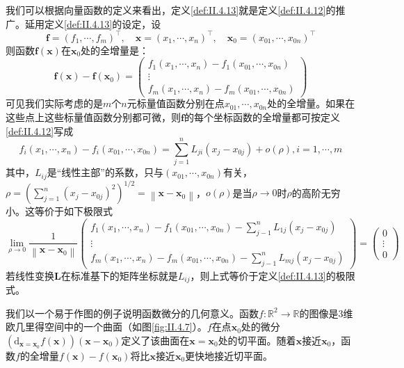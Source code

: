 \documentclass[../main.tex]{subfiles}
\begin{document}
我们可以根据向量函数的定义来看出，定义\ref{def:II.4.13}就是定义\ref{def:II.4.12}的推广。延用定义\ref{def:II.4.13}的设定，设
\[\mathbf{f}=\left(f_1,\cdots,f_m\right)^\intercal,\quad\mathbf{x}=\left(x_1,\cdots,x_n\right)^\intercal,\quad\mathbf{x}_0=\left(x_{01},\cdots,x_{0n}\right)^\intercal\]
则函数$\mathbf{f}\left(\mathbf{x}\right)$在$\mathbf{x}_0$处的全增量是：
\[
    \mathbf{f}\left(\mathbf{x}\right)-\mathbf{f}\left(\mathbf{x}_0\right)=\left(
    \begin{array}{c}
            f_1\left(x_1,\cdots,x_n\right)-f_1\left(x_{01},\cdots,x_{0n}\right) \\
            \vdots                                                              \\
            f_m\left(x_1,\cdots,x_n\right)-f_m\left(x_{01},\cdots,x_{0n}\right)
        \end{array}\right)
\]
可见我们实际考虑的是$m$个$n$元标量值函数分别在点$x_{01},\cdots,x_{0n}$处的全增量。如果在这些点上这些标量值函数分别都可微，则$\mathbf{f}$的每个坐标函数的全增量都可按定义\ref{def:II.4.12}写成
\[
    f_i\left(x_1,\cdots,x_n\right)-f_i\left(x_{01},\cdots,x_{0n}\right)=\sum_{j=1}^n L_{ji}\left(x_j-x_{0j}\right)+o\left(\rho\right),i=1,\cdots,m
\]
其中，$L_{ij}$是“线性主部”的系数，只与$\left(x_{01},\cdots,x_{0n}\right)$有关，$\rho=\left(\sum_{j=1}^n\left(x_j-x_{0j}\right)^2\right)^{1/2}=\left\|\mathbf{x}-\mathbf{x}_0\right\|$，$o\left(\rho\right)$是当$\rho\to 0$时$\rho$的高阶无穷小。这等价于如下极限式
\[
    \lim_{\rho\to 0}\frac{1}{\left\|\mathbf{x}-\mathbf{x}_0\right\|}\left(\begin{array}{c}
            f_1\left(x_1,\cdots,x_n\right)-f_1\left(x_{01},\cdots,x_{0n}\right)-\sum_{j-1}^nL_{1j}\left(x_j-x_{0j}\right) \\
            \vdots                                                                                                        \\
            f_m\left(x_1,\cdots,x_n\right)-f_m\left(x_{01},\cdots,x_{0n}\right)-\sum_{j-1}^nL_{mj}\left(x_j-x_{0j}\right)
        \end{array}\right)=\left(\begin{array}{c}0\\\vdots\\0\end{array}\right)
\]
若线性变换$\mathbf{L}$在标准基下的矩阵坐标就是$L_{ij}$，则上式等价于定义\ref{def:II.4.13}的极限式。

我们以一个易于作图的例子说明函数微分的几何意义。函数$f:\mathbb{R}^2\rightarrow\mathbb{R}$的图像是3维欧几里得空间中的一个曲面（如图\ref{fig:II.4.7}）。$f$在点$\mathbf{x}_0$处的微分$\left(\mathrm{d}_{\mathbf{x}=\mathbf{x}_0}f\left(\mathbf{x}\right)\right)\left(\mathbf{x}-\mathbf{x}_0\right)$定义了该曲面在$\mathbf{x}=\mathbf{x}_0$处的切平面。随着$\mathbf{x}$接近$\mathbf{x}_0$，函数$f$的全增量$f\left(\mathbf{x}\right)-f\left(\mathbf{x}_0\right)$将比$\mathbf{x}$接近$\mathbf{x}_0$更快地接近切平面。
\end{document}
